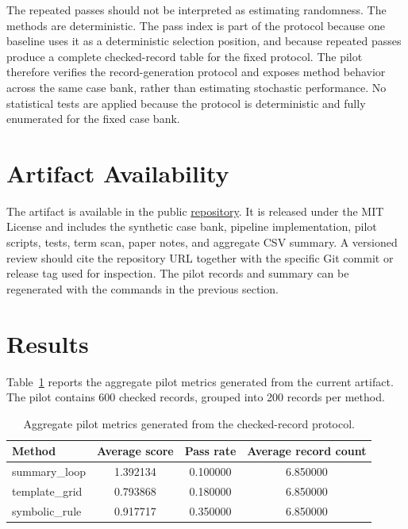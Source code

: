 \documentclass[11pt]{article}
\begin{document}
The repeated passes should not be interpreted as estimating randomness. The
methods are deterministic. The pass index is part of the protocol because one
baseline uses it as a deterministic selection position, and because repeated
passes produce a complete checked-record table for the fixed protocol. The
pilot therefore verifies the record-generation protocol and exposes method
behavior across the same case bank, rather than estimating stochastic
performance. No statistical tests are applied because the protocol is
deterministic and fully enumerated for the fixed case bank.

\section{Artifact Availability}

The artifact is available in the public
\href{https://github.com/910636071/constraint-checked-state-records}{repository}.
It is released under the MIT License and includes the synthetic case bank,
pipeline implementation, pilot scripts, tests, term scan, paper notes, and
aggregate CSV summary. A versioned review should cite the repository URL
together with the specific Git commit or release tag used for inspection. The
pilot records and summary can be regenerated with the commands in the previous
section.

\section{Results}

Table~\ref{tab:results} reports the aggregate pilot metrics generated from the
current artifact. The pilot contains 600 checked records, grouped into 200
records per method.

\begin{table}[htbp]
\centering
\caption{Aggregate pilot metrics generated from the checked-record protocol.}
\label{tab:results}
\begin{tabular}{lccc}
\toprule
Method & Average score & Pass rate & Average record count \\
\midrule
summary\_loop & 1.392134 & 0.100000 & 6.850000 \\
template\_grid & 0.793868 & 0.180000 & 6.850000 \\
symbolic\_rule & 0.917717 & 0.350000 & 6.850000 \\
\bottomrule
\end{tabular}
\end{table}
\end{document}
